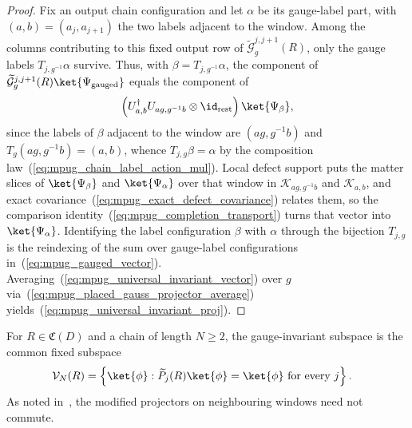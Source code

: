 \begin{proof}\leanok
    Fix an output chain configuration and let $\alpha$ be its gauge-label part,
    with $(a,b)=(a_j,a_{j+1})$ the two labels adjacent to the window. Among the
    columns contributing to this fixed output row of
    $\widetilde{\mathcal G}^{j,j+1}_g(R)$, only the gauge labels
    $T_{j,g^{-1}}\alpha$ survive. Thus, with
    $\beta=T_{j,g^{-1}}\alpha$, the component of
    $\widetilde{\mathcal G}^{j,j+1}_g(R)\ket{\Psi_{\mathrm{gauged}}}$ equals
    the component of
    \begin{align}
        \left(U_{a,b}^\dagger U_{ag,g^{-1}b}
        \otimes\id_{\mathrm{rest}}\right)\ket{\Psi_\beta},
    \end{align}
    since the labels of $\beta$ adjacent to the window are $(ag,g^{-1}b)$ and
    $T_g(ag,g^{-1}b)=(a,b)$, whence $T_{j,g}\beta=\alpha$ by the composition
    law~(\ref{eq:mpug_chain_label_action_mul}). Local defect support puts the
    matter slices of $\ket{\Psi_\beta}$ and $\ket{\Psi_\alpha}$ over that
    window in $\mathcal K_{ag,g^{-1}b}$ and $\mathcal K_{a,b}$, and exact
    covariance~(\ref{eq:mpug_exact_defect_covariance}) relates them, so the
    comparison identity~(\ref{eq:mpug_completion_transport}) turns that vector
    into $\ket{\Psi_\alpha}$. Identifying the label configuration $\beta$ with
    $\alpha$ through the bijection $T_{j,g}$ is the reindexing of the sum
    over gauge-label configurations in~(\ref{eq:mpug_gauged_vector}). Averaging~(\ref{eq:mpug_universal_invariant_vector})
    over $g$ via~(\ref{eq:mpug_placed_gauss_projector_average}) yields~(\ref{eq:mpug_universal_invariant_proj}).
\end{proof}

\begin{definition}
    \label{def:mpug_gauge_invariant_subspace}
    \leanok
    For $R\in\mathfrak C(D)$ and a chain of length $N\geq2$, the
    gauge-invariant subspace is the common fixed subspace
    \begin{align}
        \mathcal V_N(R)
         & =\left\{\ket{\phi}:
        \widetilde P_j(R)\ket{\phi}=\ket{\phi}
        \text{ for every }j\right\}.
        \label{eq:mpug_gauge_invariant_subspace}
    \end{align}
    As noted in~\cite[lines~4325--4335]{FrancoRubio2025MPUGauging}, the
    modified projectors on neighbouring windows need not commute.
\end{definition}

